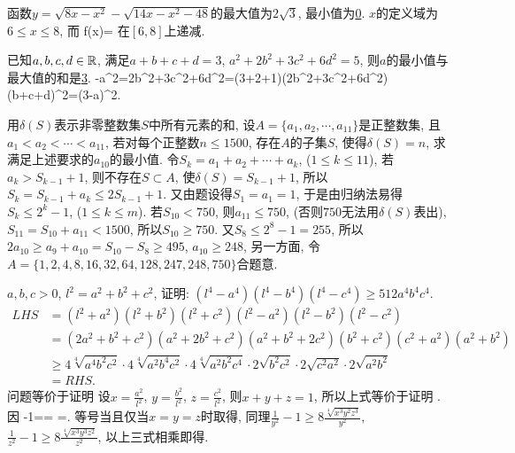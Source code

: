 \bq{}{}
函数$y=\sqrt{8x-x^2}-\sqrt{14x-x^2-48}$的最大值为\underline{$2\sqrt{3}$}, 最小值为\underline{0}.
\eq
\ba
$x$的定义域为$6\le x \le 8$, 而
\bee
f(x)=
\eee
在$[6,8]$上递减.
\ea

\bq{}{}
已知$a,b,c,d\in\mathbb{R}$, 满足$a+b+c+d=3$, $a^2+2b^2+3c^2+6d^2=5$, 
则$a$的最小值与最大值的和是\underline{3}.
\eq
\ba
{}-a^2=2b^2+3c^2+6d^2=(3+2+1)(2b^2+3c^2+6d^2)\ge(b+c+d)^2=(3-a)^2.
\eee
\ea

\bq{}{}
用$\delta(S)$表示非零整数集$S$中所有元素的和, 设$A=\{a_1,a_2,\cdots,a_{11}\}$是正整数集,
且$a_1<a_2<\cdots<a_{11}$, 若对每个正整数$n\le1500$, 存在$A$的子集$S$, 使得$\delta(S)=n$,
求满足上述要求的$a_{10}$的最小值.
\eq
\ba
令$S_k=a_1+a_2+\cdots+a_k$, ($1\le k\le 11$), 若$a_k>S_{k-1}+1$,
则不存在$S\subset A$, 使$\delta(S)=S_{k-1}+1$, 所以$S_k=S_{k-1}+a_k\le2S_{k-1}+1$.
又由题设得$S_1=a_1=1$, 于是由归纳法易得$S_k\le2^k-1$, ($1\le k\le m$).
若$S_{10}<750$, 则$a_{11}\le750$, (否则$750$无法用$\delta(S)$表出),
$S_{11}=S_{10}+a_{11}<1500$, 所以$S_{10}\ge750$.
又$S_{8}\le2^8-1=255$, 所以$2a_{10}\ge a_{9}+a_{10}=S_{10}-S_8\ge495$,
$a_{10}\ge248$, 另一方面, 令$A=\{1,2,4,8,16,32,64,128,247,248,750\}$合题意.
\ea

\bq{}{}
$a,b,c>0$, $l^2=a^2+b^2+c^2$, 证明: $(l^4-a^4)(l^4-b^4)(l^4-c^4)\ge512a^4b^4c^4$.
\eq
\ba
\begin{align*}
 LHS & = (l^2+a^2)(l^2+b^2)(l^2+c^2)(l^2-a^2)(l^2-b^2)(l^2-c^2)\\
  &=(2a^2+b^2+c^2)(a^2+2b^2+c^2)(a^2+b^2+2c^2)(b^2+c^2)(c^2+a^2)(a^2+b^2)\\
  &\ge 4\sqrt[4]{a^4b^2c^2}\cdot4\sqrt[4]{a^2b^4c^2}\cdot4\sqrt[4]{a^2b^2c^4}\cdot2\sqrt{b^2c^2}\cdot2\sqrt{c^2a^2}\cdot2\sqrt{a^2b^2}\\
  &=RHS.
\end{align*}
\ea
\ba
问题等价于证明
\bee
{}
\eee
设$x=\frac{a^2}{l^2}$, $y=\frac{b^2}{l^2}$, $z=\frac{c^2}{l^2}$, 则$x+y+z=1$, 所以上式等价于证明
\bee
{}.
\eee
因
\bee
{}-1==
  \ge{}
  \ge{}
  =.
\eee
等号当且仅当$x=y=z$时取得, 同理$\frac1{y^2}-1\ge8\frac{\sqrt[4]{x^3y^2z^3}}{y^2}$, 
$\frac{1}{z^2}-1\ge8\frac{\sqrt[4]{x^3y^3z^2}}{z^2}$, 以上三式相乘即得.
\ea

